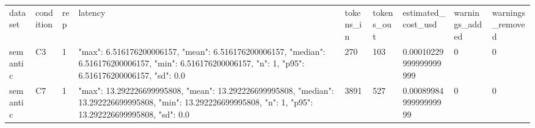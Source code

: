 \begin{tabular}{lllllllll}
dataset & condition & rep & latency & tokens\_in & tokens\_out & estimated\_cost\_usd & warnings\_added & warnings\_removed \\
semantic & C3 & 1 & {"max": 6.516176200006157, "mean": 6.516176200006157, "median": 6.516176200006157, "min": 6.516176200006157, "n": 1, "p95": 6.516176200006157, "sd": 0.0} & 270 & 103 & 0.00010229999999999999 & 0 & 0 \\
semantic & C7 & 1 & {"max": 13.292226699995808, "mean": 13.292226699995808, "median": 13.292226699995808, "min": 13.292226699995808, "n": 1, "p95": 13.292226699995808, "sd": 0.0} & 3891 & 527 & 0.0008998499999999999 & 0 & 0 \\
\end{tabular}